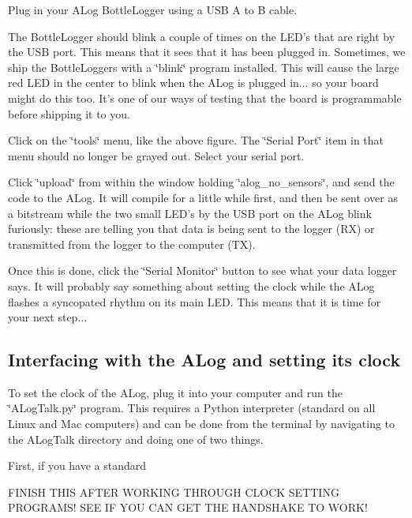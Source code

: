 \begin{DoxyEnumerate}
\item Plug in your A\+Log Bottle\+Logger using a U\+SB A to B cable.
\item The Bottle\+Logger should blink a couple of times on the L\+E\+D’s that are right by the U\+SB port. This means that it sees that it has been plugged in. Sometimes, we ship the Bottle\+Loggers with a \char`\"{}blink\char`\"{} program installed. This will cause the large red L\+ED in the center to blink when the A\+Log is plugged in... so your board might do this too. It’s one of our ways of testing that the board is programmable before shipping it to you.
\item Click on the \char`\"{}tools\char`\"{} menu, like the above figure. The \char`\"{}\+Serial Port\char`\"{} item in that menu should no longer be grayed out. Select your serial port.
\item Click \char`\"{}upload\char`\"{} from within the window holding \char`\"{}alog\+\_\+no\+\_\+sensors\char`\"{}, and send the code to the A\+Log. It will compile for a little while first, and then be sent over as a bitstream while the two small L\+E\+D’s by the U\+SB port on the A\+Log blink furiously\+: these are telling you that data is being sent to the logger (RX) or transmitted from the logger to the computer (TX).
\item Once this is done, click the \char`\"{}\+Serial Monitor\char`\"{} button to see what your data logger says. It will probably say something about setting the clock while the A\+Log flashes a syncopated rhythm on its main L\+ED. This means that it is time for your next step...
\end{DoxyEnumerate}\hypertarget{index_clock_setting}{}\subsection{Interfacing with the A\+Log and setting its clock}\label{index_clock_setting}
To set the clock of the A\+Log, plug it into your computer and run the \char`\"{}\+A\+Log\+Talk.\+py\char`\"{} program. This requires a Python interpreter (standard on all Linux and Mac computers) and can be done from the terminal by navigating to the A\+Log\+Talk directory and doing one of two things.

First, if you have a standard

F\+I\+N\+I\+SH T\+H\+IS A\+F\+T\+ER W\+O\+R\+K\+I\+NG T\+H\+R\+O\+U\+GH C\+L\+O\+CK S\+E\+T\+T\+I\+NG P\+R\+O\+G\+R\+A\+M\+S! S\+EE IF Y\+OU C\+AN G\+ET T\+HE H\+A\+N\+D\+S\+H\+A\+KE TO W\+O\+R\+K!

